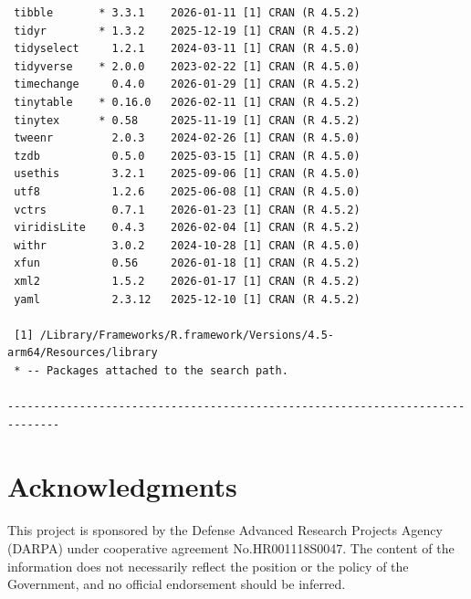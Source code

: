 \documentclass[article]{jss}
\begin{document}
\begin{tcolorbox}[enhanced jigsaw, arc=.35mm, bottomrule=.15mm, breakable, colback=white, colframe=quarto-callout-color-frame, left=2mm, leftrule=.75mm, opacityback=0, rightrule=.15mm, toprule=.15mm]
\begin{verbatim}
 tibble       * 3.3.1    2026-01-11 [1] CRAN (R 4.5.2)
 tidyr        * 1.3.2    2025-12-19 [1] CRAN (R 4.5.2)
 tidyselect     1.2.1    2024-03-11 [1] CRAN (R 4.5.0)
 tidyverse    * 2.0.0    2023-02-22 [1] CRAN (R 4.5.0)
 timechange     0.4.0    2026-01-29 [1] CRAN (R 4.5.2)
 tinytable    * 0.16.0   2026-02-11 [1] CRAN (R 4.5.2)
 tinytex      * 0.58     2025-11-19 [1] CRAN (R 4.5.2)
 tweenr         2.0.3    2024-02-26 [1] CRAN (R 4.5.0)
 tzdb           0.5.0    2025-03-15 [1] CRAN (R 4.5.0)
 usethis        3.2.1    2025-09-06 [1] CRAN (R 4.5.0)
 utf8           1.2.6    2025-06-08 [1] CRAN (R 4.5.0)
 vctrs          0.7.1    2026-01-23 [1] CRAN (R 4.5.2)
 viridisLite    0.4.3    2026-02-04 [1] CRAN (R 4.5.2)
 withr          3.0.2    2024-10-28 [1] CRAN (R 4.5.0)
 xfun           0.56     2026-01-18 [1] CRAN (R 4.5.2)
 xml2           1.5.2    2026-01-17 [1] CRAN (R 4.5.2)
 yaml           2.3.12   2025-12-10 [1] CRAN (R 4.5.2)

 [1] /Library/Frameworks/R.framework/Versions/4.5-arm64/Resources/library
 * -- Packages attached to the search path.

------------------------------------------------------------------------------
\end{verbatim}

\end{tcolorbox}

\section*{Acknowledgments}\label{acknowledgments}

\begin{tcolorbox}[enhanced jigsaw, arc=.35mm, bottomrule=.15mm, breakable, colback=white, colframe=quarto-callout-color-frame, left=2mm, leftrule=.75mm, opacityback=0, rightrule=.15mm, toprule=.15mm]

This project is sponsored by the Defense Advanced Research Projects
Agency (DARPA) under cooperative agreement No.HR001118S0047. The content
of the information does not necessarily reflect the position or the
policy of the Government, and no official endorsement should be
inferred.

\end{tcolorbox}



\end{document}
